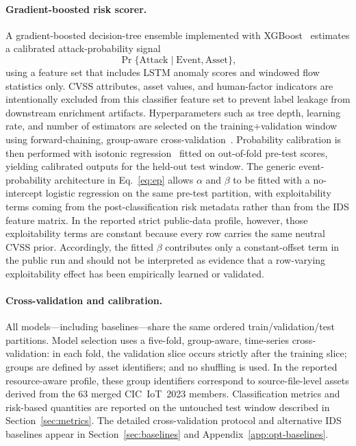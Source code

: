 \documentclass[preprint,12pt]{elsarticle}
\begin{document}
\paragraph{Gradient-boosted risk scorer.}
A gradient-boosted decision-tree ensemble implemented with XGBoost~\cite{Chen2016_XGBoost} estimates a calibrated attack-probability signal
\[
\Pr\{\mathrm{Attack}\mid \mathrm{Event},\mathrm{Asset}\},
\]
using a feature set that includes LSTM anomaly scores and windowed flow statistics only. CVSS attributes, asset values, and human-factor indicators are intentionally excluded from this classifier feature set to prevent label leakage from downstream enrichment artifacts. Hyperparameters such as tree depth, learning rate, and number of estimators are selected on the training+validation window using forward-chaining, group-aware cross-validation~\cite{Pedregosa2011_Scikit}. Probability calibration is then performed with isotonic regression~\cite{Niculescu2005_Isotonic} fitted on out-of-fold pre-test scores, yielding calibrated outputs for the held-out test window. The generic event-probability architecture in Eq.~\eqref{eq:ep} allows $\alpha$ and $\beta$ to be fitted with a no-intercept logistic regression on the same pre-test partition, with exploitability terms coming from the post-classification risk metadata rather than from the IDS feature matrix. In the reported strict public-data profile, however, those exploitability terms are constant because every row carries the same neutral CVSS prior. Accordingly, the fitted $\beta$ contributes only a constant-offset term in the public run and should not be interpreted as evidence that a row-varying exploitability effect has been empirically learned or validated.

\paragraph{Cross-validation and calibration.}
All models---including baselines---share the same ordered train/validation/test partitions. Model selection uses a five-fold, group-aware, time-series cross-validation: in each fold, the validation slice occurs strictly after the training slice; groups are defined by asset identifiers; and no shuffling is used. In the reported resource-aware profile, these group identifiers correspond to source-file-level assets derived from the 63 merged CIC~IoT~2023 members. Classification metrics and risk-based quantities are reported on the untouched test window described in Section~\ref{sec:metrics}. The detailed cross-validation protocol and alternative IDS baselines appear in Section~\ref{sec:baselines} and Appendix~\ref{app:opt-baselines}.
\end{document}
